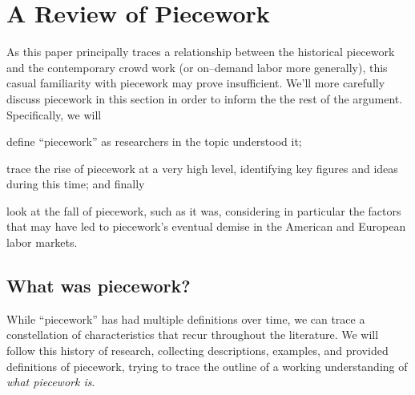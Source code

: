 \documentclass[trackingWork]{subfiles}
\begin{document}
\section{A Review of Piecework}

As this paper principally traces a relationship between
the historical piecework and the contemporary crowd work
(or on--demand labor more generally),
this casual familiarity with piecework may prove insufficient.
We'll more carefully discuss piecework in this section in order
to inform the the rest of the argument.
Specifically, we will
\begin{inlinelist}
  \item define ``piecework'' as researchers in the topic understood it;
  \item trace the rise of piecework at a very high level,
        identifying key figures and ideas during this time; and finally
  \item look at the fall of piecework, such as it was,
        considering in particular
        the factors that may have led to piecework's
        eventual demise in the American and European labor markets.
\end{inlinelist}



\subsection{What was piecework?}
While ``piecework'' has had multiple definitions over time,
we can trace a constellation of characteristics that recur throughout the literature.
We will follow this history of research, collecting
descriptions,
examples, and
provided definitions of piecework, trying
to trace the outline of a working understanding of
\textit{what piecework is}.
\end{document}
